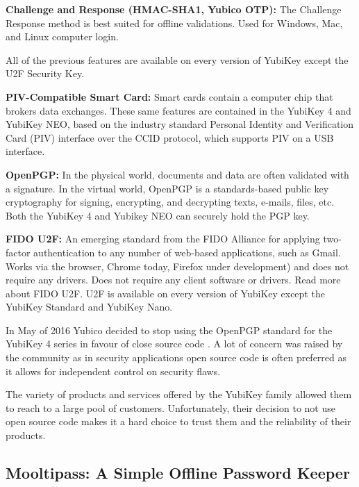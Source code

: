 \textbf{Challenge and Response (HMAC-SHA1, Yubico OTP): }
The Challenge Response method is best suited for offline validations. Used for Windows, Mac, and Linux computer login.

\vspace{8pt}

All of the previous features are available on every version of YubiKey except the U2F Security Key.

\textbf{PIV-Compatible Smart Card: }
Smart cards contain a computer chip that brokers data exchanges. These same features are contained in the YubiKey 4 and YubiKey NEO, based on the industry standard Personal Identity and Verification Card (PIV) interface over the CCID protocol, which supports PIV on a USB interface.

\textbf{OpenPGP: }
In the physical world, documents and data are often validated with a signature. In the virtual world, OpenPGP is a standards-based public key cryptography for signing, encrypting, and decrypting texts, e-mails, files, etc. Both the YubiKey 4 and Yubikey NEO can securely hold the PGP key.

\textbf{FIDO U2F: }
An emerging standard from the FIDO Alliance for applying two-factor authentication to any number of web-based applications, such as Gmail. Works via the browser, Chrome today, Firefox under development) and does not require any drivers. Does not require any client software or drivers. Read more about FIDO U2F.  U2F is available on every version of YubiKey except the YubiKey Standard and YubiKey Nano.

\vspace{10pt}


In May of 2016 Yubico decided to stop using the OpenPGP standard for the YubiKey 4 series in favour of close source code \cite{yubiopen}. A lot of concern was raised by the community as in security applications open source code is often preferred as it allows for independent control on security flaws.

The variety of products and services offered by the YubiKey family allowed them to reach to a large pool of customers. Unfortunately, their decision to not use open source code makes it a hard choice to trust them and the reliability of their products.


\subsection{Mooltipass: A Simple Offline Password Keeper} 

